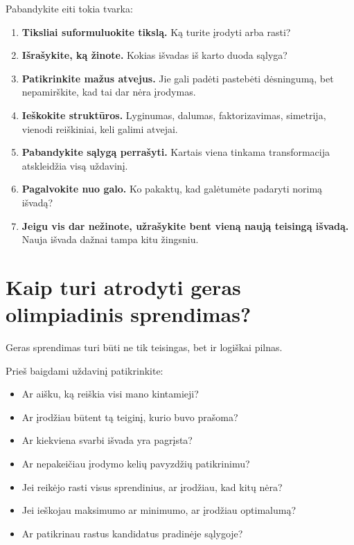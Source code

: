\documentclass[11pt,a4paper]{scrartcl}
\begin{document}
Pabandykite eiti tokia tvarka:

\begin{enumerate}
    \renewcommand{\labelenumi}{\textbf{\theenumi.}}

    \item \textbf{Tiksliai suformuluokite tikslą.}
    Ką turite įrodyti arba rasti?

    \item \textbf{Išrašykite, ką žinote.}
    Kokias išvadas iš karto duoda sąlyga?

    \item \textbf{Patikrinkite mažus atvejus.}
    Jie gali padėti pastebėti dėsningumą, bet nepamirškite, kad tai dar
    nėra įrodymas.

    \item \textbf{Ieškokite struktūros.}
    Lyginumas, dalumas, faktorizavimas, simetrija, vienodi reiškiniai,
    keli galimi atvejai.

    \item \textbf{Pabandykite sąlygą perrašyti.}
    Kartais viena tinkama transformacija atskleidžia visą uždavinį.

    \item \textbf{Pagalvokite nuo galo.}
    Ko pakaktų, kad galėtumėte padaryti norimą išvadą?

    \item \textbf{Jeigu vis dar nežinote, užrašykite bent vieną naują
    teisingą išvadą.}
    Nauja išvada dažnai tampa kitu žingsniu.
\end{enumerate}

\section{Kaip turi atrodyti geras olimpiadinis sprendimas?}

Geras sprendimas turi būti ne tik teisingas, bet ir logiškai pilnas.

Prieš baigdami uždavinį patikrinkite:

\begin{itemize}
    \item Ar aišku, ką reiškia visi mano kintamieji?
    \item Ar įrodžiau būtent tą teiginį, kurio buvo prašoma?
    \item Ar kiekviena svarbi išvada yra pagrįsta?
    \item Ar nepakeičiau įrodymo kelių pavyzdžių patikrinimu?
    \item Jei reikėjo rasti visus sprendinius, ar įrodžiau, kad kitų nėra?
    \item Jei ieškojau maksimumo ar minimumo, ar įrodžiau optimalumą?
    \item Ar patikrinau rastus kandidatus pradinėje sąlygoje?
\end{itemize}
\end{document}
